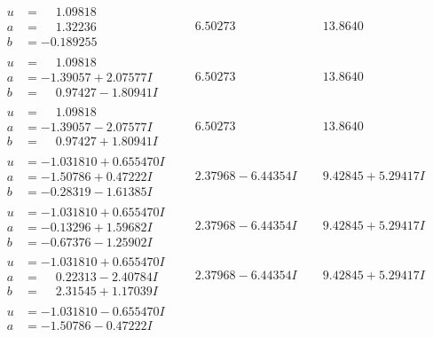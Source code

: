\documentclass[1p]{elsarticle_modified}
\theoremstyle{definition}
\begin{document}
$$\begin{array}{c|c|c}
\begin{aligned}
u &= \phantom{-}1.09818\phantom{ +0.000000I} \\
a &= \phantom{-}1.32236\phantom{ +0.000000I} \\
b &= -0.189255\phantom{ +0.000000I}\end{aligned}
 & \phantom{-}6.50273\phantom{ +0.000000I} & \phantom{-}13.8640\phantom{ +0.000000I} \\ \hline\begin{aligned}
u &= \phantom{-}1.09818\phantom{ +0.000000I} \\
a &= -1.39057 + 2.07577 I \\
b &= \phantom{-}0.97427 - 1.80941 I\end{aligned}
 & \phantom{-}6.50273\phantom{ +0.000000I} & \phantom{-}13.8640\phantom{ +0.000000I} \\ \hline\begin{aligned}
u &= \phantom{-}1.09818\phantom{ +0.000000I} \\
a &= -1.39057 - 2.07577 I \\
b &= \phantom{-}0.97427 + 1.80941 I\end{aligned}
 & \phantom{-}6.50273\phantom{ +0.000000I} & \phantom{-}13.8640\phantom{ +0.000000I} \\ \hline\begin{aligned}
u &= -1.031810 + 0.655470 I \\
a &= -1.50786 + 0.47222 I \\
b &= -0.28319 - 1.61385 I\end{aligned}
 & \phantom{-}2.37968 - 6.44354 I & \phantom{-}9.42845 + 5.29417 I \\ \hline\begin{aligned}
u &= -1.031810 + 0.655470 I \\
a &= -0.13296 + 1.59682 I \\
b &= -0.67376 - 1.25902 I\end{aligned}
 & \phantom{-}2.37968 - 6.44354 I & \phantom{-}9.42845 + 5.29417 I \\ \hline\begin{aligned}
u &= -1.031810 + 0.655470 I \\
a &= \phantom{-}0.22313 - 2.40784 I \\
b &= \phantom{-}2.31545 + 1.17039 I\end{aligned}
 & \phantom{-}2.37968 - 6.44354 I & \phantom{-}9.42845 + 5.29417 I \\ \hline\begin{aligned}
u &= -1.031810 - 0.655470 I \\
a &= -1.50786 - 0.47222 I \\

\end{aligned}
\end{array}$$
\end{document}
